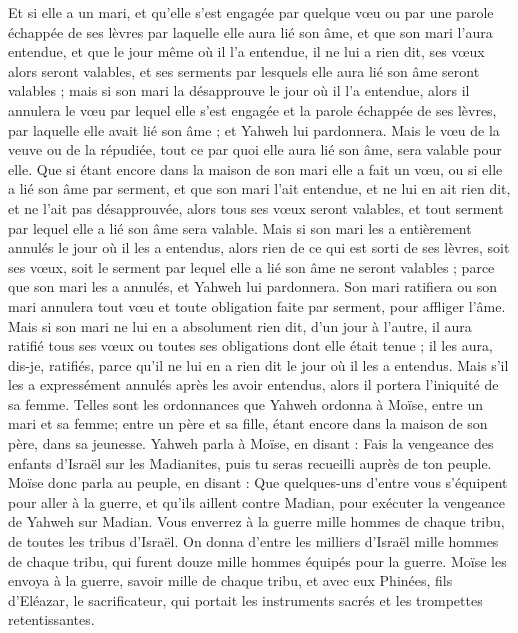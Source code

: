 \begin{multicols}{2}
Et si elle a un mari, et qu'elle s'est engagée par quelque vœu ou par une parole échappée de ses lèvres par laquelle elle aura lié son âme,
et que son mari l'aura entendue, et que le jour même où il l'a entendue, il ne lui a rien dit, ses vœux alors seront valables, et ses serments par lesquels elle aura lié son âme seront valables ;
mais si son mari la désapprouve le jour où il l'a entendue, alors il annulera le vœu par lequel elle s'est engagée et la parole échappée de ses lèvres, par laquelle elle avait lié son âme ; et Yahweh lui pardonnera.
Mais le vœu de la veuve ou de la répudiée, tout ce par quoi elle aura lié son âme, sera valable pour elle.
Que si étant encore dans la maison de son mari elle a fait un vœu, ou si elle a lié son âme par serment,
et que son mari l'ait entendue, et ne lui en ait rien dit, et ne l'ait pas désapprouvée, alors tous ses vœux seront valables, et tout serment par lequel elle a lié son âme sera valable.
Mais si son mari les a entièrement annulés le jour où il les a entendus, alors rien de ce qui est sorti de ses lèvres, soit ses vœux, soit le serment par lequel elle a lié son âme ne seront valables ; parce que son mari les a annulés, et Yahweh lui pardonnera.
Son mari ratifiera ou son mari annulera tout vœu et toute obligation faite par serment, pour affliger l'âme.
Mais si son mari ne lui en a absolument rien dit, d’un jour à l’autre, il aura ratifié tous ses vœux ou toutes ses obligations dont elle était tenue ; il les aura, dis-je, ratifiés, parce qu'il ne lui en a rien dit le jour où il les a entendus.
Mais s'il les a expressément annulés après les avoir entendus, alors il portera l'iniquité de sa femme.
Telles sont les ordonnances que Yahweh ordonna à Moïse, entre un mari et sa femme; entre un père et sa fille, étant encore dans la maison de son père, dans sa jeunesse.
\VerseOne{}Yahweh parla à Moïse, en disant :
Fais la vengeance des enfants d'Israël sur les Madianites, puis tu seras recueilli auprès de ton peuple.
Moïse donc parla au peuple, en disant : Que quelques-uns d'entre vous s'équipent pour aller à la guerre, et qu'ils aillent contre Madian, pour exécuter la vengeance de Yahweh sur Madian.
Vous enverrez à la guerre mille hommes de chaque tribu, de toutes les tribus d'Israël.
On donna d'entre les milliers d'Israël mille hommes de chaque tribu, qui furent douze mille hommes équipés pour la guerre.
Moïse les envoya à la guerre, savoir mille de chaque tribu, et avec eux Phinées, fils d'Eléazar, le sacrificateur, qui portait les instruments sacrés et les trompettes retentissantes.

\end{multicols}
